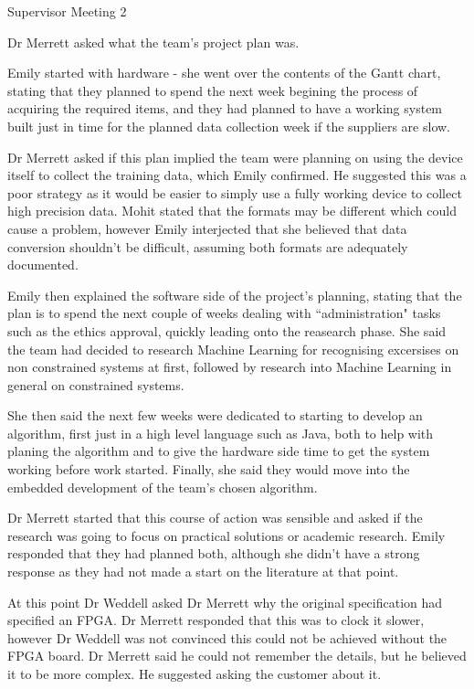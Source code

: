 \documentclass{article}
\begin{document}
\begin{Minutes}{Supervisor Meeting 2}

Dr Merrett asked what the team's project plan was.

Emily started with hardware - she went over the contents of the Gantt chart, stating that they
planned to spend the next week begining the process of acquiring the required items, and they
had planned to have a working system built just in time for the planned data collection week
if the suppliers are slow.

Dr Merrett asked if this plan implied the team were planning on using the
device itself to collect the training data, which Emily confirmed. He suggested this was a
poor strategy as it would be easier to simply use a fully working device to collect high
precision data. Mohit stated that the formats may be different which could cause a problem,
however Emily interjected that she believed that data conversion shouldn't be difficult,
assuming both formats are adequately documented.

Emily then explained the software side of the project's planning, stating that the plan is
to spend the next couple of weeks dealing with ``administration" tasks such as the ethics
approval, quickly leading onto the reasearch phase. She said the team had decided to research
Machine Learning for recognising excersises on non constrained systems at first, followed by
research into Machine Learning in general on constrained systems.

She then said the next few weeks were dedicated to starting to develop an algorithm, first
just in a high level language such as Java, both to help with planing the algorithm and to
give the hardware side time to get the system working before work started. Finally, she said
they would move into the embedded development of the team's chosen algorithm.

Dr Merrett started that this course of action was sensible and asked if the research was going
to focus on practical solutions or academic research. Emily responded that they had planned
both, although she didn't have a strong response as they had not made a start on the literature
at that point.

At this point Dr Weddell asked Dr Merrett why the original specification had specified an
FPGA. Dr Merrett responded that this was to clock it slower, however Dr Weddell was not
convinced this could not be achieved without the FPGA board. Dr Merrett said he could not
remember the details, but he believed it to be more complex. He suggested asking the customer
about it.


\end{Minutes}
\end{document}
